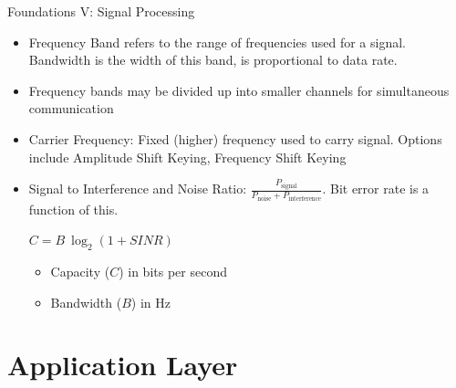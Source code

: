 \documentclass{beamer}
\begin{document}
\begin{frame}[t]{Foundations V: Signal Processing}
\begin{itemize}
    \item \alert{Frequency Band} refers to the range of frequencies used for a signal. \alert{Bandwidth} is the width of this band, is proportional to data rate.
    \item Frequency bands may be divided up into smaller \alert{channels} for simultaneous communication
    \item \pause \alert{Carrier Frequency}: Fixed (higher) frequency used to carry signal. Options include \alert{Amplitude Shift Keying}, \alert{Frequency Shift Keying}
    \item \pause \alert{Signal to Interference and Noise Ratio}: $\frac{P_{\text{signal}}}{P_{\text{noise}}+ P_{\text{interference}}}$. Bit error rate is a function of this. 
    \begin{theorem}
        $C = B\> \log_2 (1 + SINR)$
        \begin{itemize}
            \item Capacity ($C$) in bits per second
            \item Bandwidth ($B$) in Hz
        \end{itemize}
    \end{theorem}
\end{itemize}
    
\end{frame}

\section{Application Layer}
\end{document}
